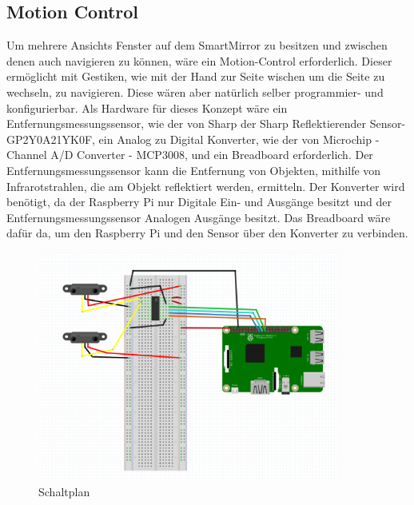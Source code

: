 \subsection{Motion Control}
Um mehrere Ansichts Fenster auf dem SmartMirror zu besitzen und zwischen denen auch navigieren zu können, wäre ein Motion-Control erforderlich. Dieser ermöglicht mit Gestiken, wie mit der Hand zur Seite wischen um die Seite zu wechseln, zu navigieren. Diese wären aber natürlich selber programmier- und konfigurierbar. 
Als Hardware für dieses Konzept wäre ein Entfernungsmessungssensor, wie der von Sharp der \dq Sharp Reflektierender Sensor- GP2Y0A21YK0F\dq *, ein Analog zu Digital Konverter, wie der von Microchip -Channel A/D Converter - MCP3008\dq *, und ein Breadboard erforderlich.
Der Entfernungsmessungssensor kann die Entfernung von Objekten, mithilfe von Infrarotstrahlen, die am Objekt reflektiert werden, ermitteln. Der Konverter wird benötigt, da der Raspberry Pi nur Digitale Ein- und Ausgänge besitzt und der Entfernungsmessungssensor Analogen Ausgänge besitzt. Das Breadboard wäre dafür da, um den Raspberry Pi und den Sensor über den Konverter zu verbinden.
\begin{figure}[h]
\includegraphics[width=100mm]{pictures/Motion-Control_Plan.PNG}
\caption{Schaltplan}
\end{figure}